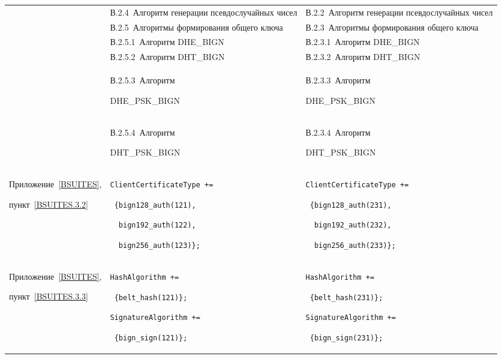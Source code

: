 \begin{center}
\begin{tabular}{|p{3.5cm}|p{6cm}|p{6cm}|}
\\
\cline{2-3}
&
В.2.4~Алгоритм генерации псевдослучайных чисел
&
В.2.2~Алгоритм генерации псевдослучайных чисел
\\
\cline{2-3}
&
В.2.5~Алгоритмы формирования общего ключа
&
В.2.3~Алгоритмы формирования общего ключа
\\
\cline{2-3}
&
В.2.5.1~Алгоритм DHE\_BIGN
&
В.2.3.1~Алгоритм DHE\_BIGN
\\
\cline{2-3}
&
В.2.5.2~Алгоритм DHT\_BIGN
&
В.2.3.2~Алгоритм DHT\_BIGN
\\
\cline{2-3}
&
В.2.5.3~Алгоритм\par DHE\_PSK\_BIGN
&
В.2.3.3~Алгоритм\par DHE\_PSK\_BIGN
\\
\cline{2-3}
&
В.2.5.4~Алгоритм\par DHT\_PSK\_BIGN
&
В.2.3.4~Алгоритм\par DHT\_PSK\_BIGN
\\
\hline
Приложение~\ref{BSUITES},\par
пункт~\ref{BSUITES.3.2} 
&
\lstinline|ClientCertificateType +=|\par
\lstinline| {bign128_auth(121),|\par
\lstinline|  bign192_auth(122),|\par
\lstinline|  bign256_auth(123)};|
&
\lstinline|ClientCertificateType +=|\par
\lstinline| {bign128_auth(231),|\par
\lstinline|  bign192_auth(232),|\par
\lstinline|  bign256_auth(233)};|
\\
\hline
Приложение~\ref{BSUITES},\par
пункт~\ref{BSUITES.3.3} 
&
\lstinline|HashAlgorithm +=|\par
\lstinline| {belt_hash(121)};|\par
\lstinline|SignatureAlgorithm +=|\par
\lstinline| {bign_sign(121)};|
&
\lstinline|HashAlgorithm +=|\par
\lstinline| {belt_hash(231)};|\par
\lstinline|SignatureAlgorithm +=|\par
\lstinline| {bign_sign(231)};|
\\
\hline
\end{tabular}
\end{center}